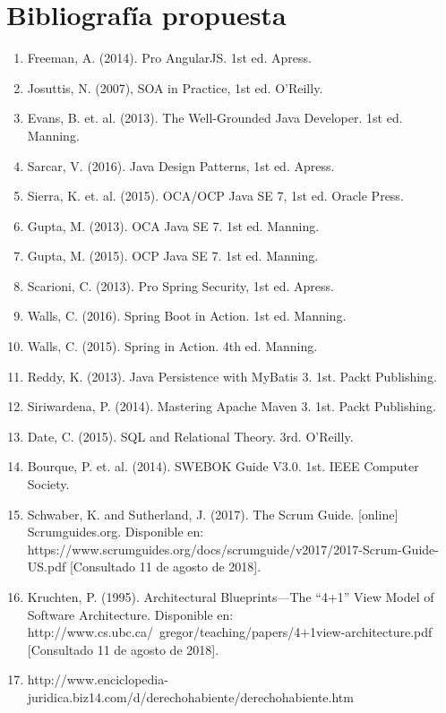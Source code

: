 \documentclass[a4paper,10pt]{article}
\begin{document}
\section{Bibliografía propuesta}
\begin{enumerate}
\item Freeman, A. (2014). Pro AngularJS. 1st ed. Apress.
\item Josuttis, N. (2007), SOA in Practice, 1st ed. O’Reilly.
\item Evans, B. et. al. (2013). The Well-Grounded Java Developer. 1st ed. Manning.
\item Sarcar, V. (2016). Java Design Patterns, 1st ed. Apress.
\item Sierra, K. et. al. (2015). OCA/OCP Java SE 7, 1st ed. Oracle Press.
\item Gupta, M. (2013). OCA Java SE 7. 1st ed. Manning.
\item Gupta, M. (2015). OCP Java SE 7. 1st ed. Manning.
\item Scarioni, C. (2013). Pro Spring Security, 1st ed. Apress.
\item Walls, C. (2016). Spring Boot in Action. 1st ed. Manning.
\item Walls, C. (2015). Spring in Action. 4th ed. Manning.
\item Reddy, K. (2013). Java Persistence with MyBatis 3. 1st. Packt Publishing.
\item Siriwardena, P. (2014). Mastering Apache Maven 3. 1st. Packt Publishing.
\item Date, C. (2015). SQL and Relational Theory. 3rd. O’Reilly.
\item Bourque, P. et. al. (2014). SWEBOK Guide V3.0. 1st. IEEE Computer Society.
\item Schwaber, K. and Sutherland, J. (2017). The Scrum Guide. [online] Scrumguides.org. Disponible en: https://www.scrumguides.org/docs/scrumguide/v2017/2017-Scrum-Guide-US.pdf [Consultado 11  de agosto de 2018].
\item Kruchten, P. (1995). Architectural Blueprints—The “4+1” View Model of Software Architecture.  Disponible en: http://www.cs.ubc.ca/~gregor/teaching/papers/4+1view-architecture.pdf [Consultado 11 de agosto de 2018].
\item http://www.enciclopedia-juridica.biz14.com/d/derechohabiente/derechohabiente.htm
\end{enumerate}
 
\end{document}
